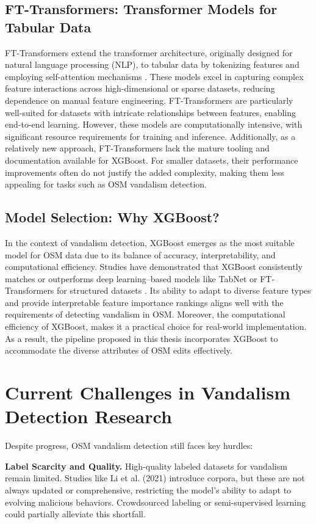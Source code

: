 \documentclass[
    13pt, %
    a4paper, %
    twoside, 
    DIV14, %
    listof=totoc, %
    bibliography=totoc, %
    index=totoc, %
    headsepline
]{scrreprt}
\begin{document}
\subsection{FT-Transformers: Transformer Models for Tabular Data}
FT-Transformers extend the transformer architecture, originally designed for natural language processing (NLP), to tabular data by tokenizing features and employing self-attention mechanisms \cite{Gorishniy2021}. These models excel in capturing complex feature interactions across high-dimensional or sparse datasets, reducing dependence on manual feature engineering. FT-Transformers are particularly well-suited for datasets with intricate relationships between features, enabling end-to-end learning. However, these models are computationally intensive, with significant resource requirements for training and inference. Additionally, as a relatively new approach, FT-Transformers lack the mature tooling and documentation available for XGBoost. For smaller datasets, their performance improvements often do not justify the added complexity, making them less appealing for tasks such as OSM vandalism detection.

\subsection{Model Selection: Why XGBoost?}
In the context of vandalism detection, XGBoost emerges as the most suitable model for OSM data due to its balance of accuracy, interpretability, and computational efficiency. Studies have demonstrated that XGBoost consistently matches or outperforms deep learning–based models like TabNet or FT-Transformers for structured datasets \cite{Chen2016, Gorishniy2021}. Its ability to adapt to diverse feature types and provide interpretable feature importance rankings aligns well with the requirements of detecting vandalism in OSM. Moreover, the computational efficiency of XGBoost, makes it a practical choice for real-world implementation. As a result, the pipeline proposed in this thesis incorporates XGBoost to accommodate the diverse attributes of OSM edits effectively.


\section{Current Challenges in Vandalism Detection Research}

Despite progress, OSM vandalism detection still faces key hurdles:

\noindent
\textbf{Label Scarcity and Quality.}
High-quality labeled datasets for vandalism remain limited. Studies like Li et al. (2021) \cite{Li2021} introduce corpora, but these are not always updated or comprehensive, restricting the model’s ability to adapt to evolving malicious behaviors. Crowdsourced labeling or semi-supervised learning could partially alleviate this shortfall.
\end{document}
